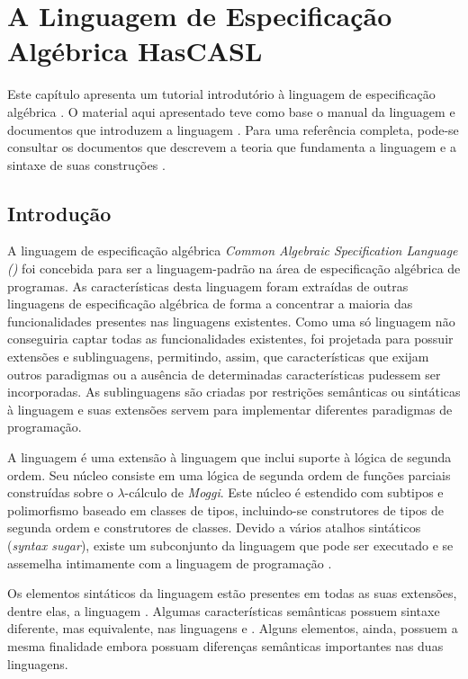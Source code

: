 \chapter{A Linguagem de Especificação Algébrica HasCASL}
\label{chap:HasCASLTutorial}

Este capítulo apresenta um tutorial introdutório à linguagem de especificação algébrica \HasCASL.
O material aqui apresentado teve como base o manual da linguagem \CASL \cite{CoFI:2004:CASL-RM} e documentos que introduzem a linguagem \HasCASL \cite{SchroderMossakowski02,SchroderMossakowski08}.
Para uma referência completa, pode-se consultar os documentos que descrevem a teoria que fundamenta a linguagem \HasCASL \cite{Schroder05b} e a sintaxe de suas construções \cite{SchroderEtAl03}.

\section{Introdução}
A linguagem de especificação algébrica \textit{Common Algebraic Specification Language (\CASL)} foi concebida para ser a linguagem-padrão na área de especificação algébrica de programas.
As características desta linguagem foram extraídas de outras linguagens de especificação algébrica de forma a concentrar a maioria das funcionalidades presentes nas linguagens existentes.
Como uma só linguagem não conseguiria captar todas as funcionalidades existentes, \CASL foi projetada para possuir extensões e sublinguagens, permitindo, assim, que características que exijam outros paradigmas ou a ausência de determinadas características pudessem ser incorporadas.
As sublinguagens são criadas por restrições semânticas ou sintáticas à linguagem \CASL e suas extensões servem para implementar diferentes paradigmas de programação.

A linguagem \HasCASL é uma extensão à linguagem \CASL que inclui suporte à lógica de segunda ordem.
Seu núcleo consiste em uma lógica de segunda ordem de funções parciais construídas sobre o $\lambda$-cálculo de \textit{Moggi}.
Este núcleo é estendido com subtipos e polimorfismo baseado em classes de tipos, incluindo-se construtores de tipos de segunda ordem e construtores de classes.
Devido a vários atalhos sintáticos (\textit{syntax sugar}), existe um subconjunto da linguagem \HasCASL que pode ser executado e se assemelha intimamente com a linguagem de programação \Haskell.

Os elementos sintáticos da linguagem \CASL estão presentes em todas as suas extensões, dentre elas, a linguagem \HasCASL.
Algumas características semânticas possuem sintaxe diferente, mas equivalente, nas linguagens \CASL e \HasCASL.
Alguns elementos, ainda, possuem a mesma finalidade embora possuam diferenças semânticas importantes nas duas linguagens.


